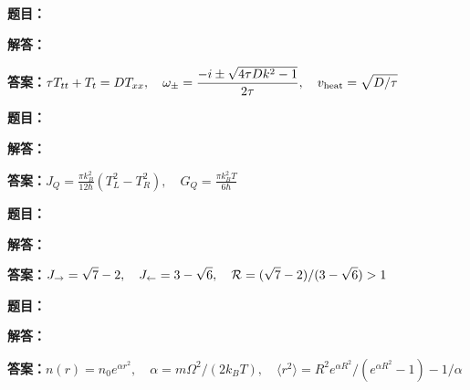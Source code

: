 \documentclass[lang=cn,color=blue,11pt]{elegantbook}
\begin{document}
\par\smallskip\noindent\hrulefill\par\medskip
{}\par
\noindent\textbf{题目：}
\par\noindent\textbf{解答：}
\par\noindent\textbf{答案：}\(\displaystyle \tau T_{tt}+T_t=D T_{xx},\quad \omega_\pm=\frac{-i\pm\sqrt{4\tau Dk^2-1}}{2\tau},\quad v_{\rm heat}=\sqrt{D/\tau}\)\par
\par\smallskip\noindent\hrulefill\par\medskip
{}\par
\noindent\textbf{题目：}
\par\noindent\textbf{解答：}
\par\noindent\textbf{答案：}\(\displaystyle J_Q=\frac{\pi k_B^2}{12\hbar}(T_L^2-T_R^2),\quad G_Q=\frac{\pi k_B^2 T}{6\hbar}\)\par
\par\smallskip\noindent\hrulefill\par\medskip
{}\par
\noindent\textbf{题目：}
\par\noindent\textbf{解答：}
\par\noindent\textbf{答案：}\(\displaystyle J_{\rightarrow}=\sqrt7-2,\quad J_{\leftarrow}=3-\sqrt6,\quad {\cal R}=(\sqrt7-2)/(3-\sqrt6)>1\)\par
\par\smallskip\noindent\hrulefill\par\medskip
{}\par
\noindent\textbf{题目：}
\par\noindent\textbf{解答：}
\par\noindent\textbf{答案：}\(\displaystyle n(r)=n_0e^{\alpha r^2},\quad\alpha=m\Omega^2/(2k_BT),\quad \langle r^2\rangle=R^2e^{\alpha R^2}/(e^{\alpha R^2}-1)-1/\alpha\)\par
\end{document}
